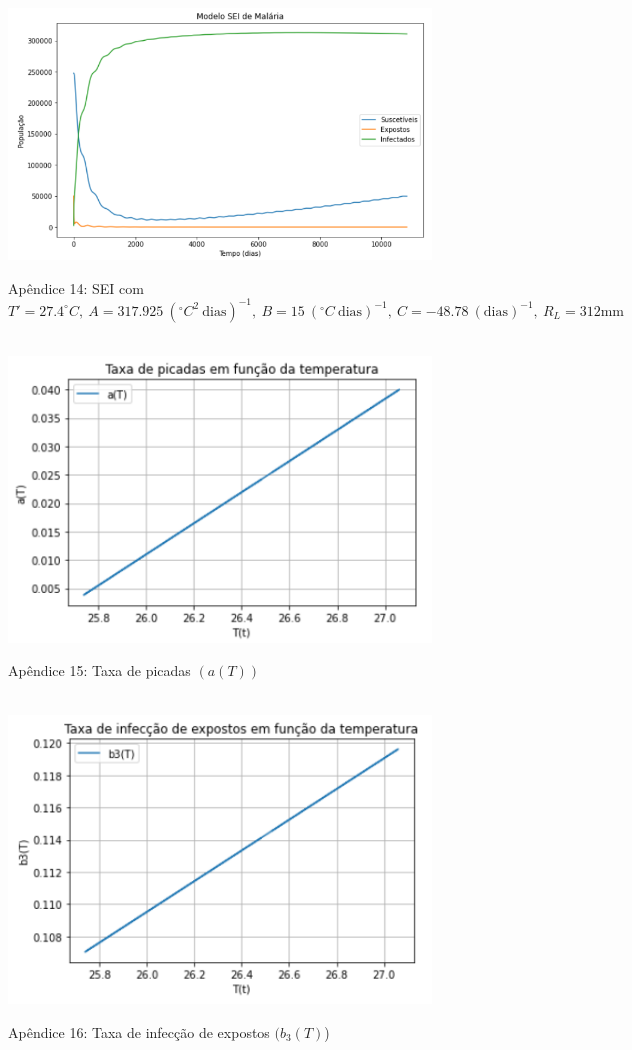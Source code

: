 \documentclass[12pt]{article}
\begin{document}
\begin{figure}[!ht]
        \centering
        \hbox{\hspace{3.5em} \includegraphics[scale=0.6] {SEI_Correcao_max_T_linha.png}}
        \caption*{Apêndice 14: SEI com $T'=27.4^\circ C, \ A=317.925 \ (^\circ C^2 \ \text{dias})^{-1}, \ B=15 \ (^\circ C \ \text{dias})^{-1}, \ C=-48.78 \ (\text{dias})^{-1}, \ R_L=312 \text{mm}$}
\end{figure}
\newpage
\begin{figure}[!ht]
        \centering
        \hbox{\hspace{4.0em} \includegraphics[scale=1.0] {Plot_a(T).png}}
        \caption*{Apêndice 15: Taxa de picadas $(a(T))$} 
\end{figure} 
\begin{figure}[!ht]
        \centering
        \hbox{\hspace{4.0em} \includegraphics[scale=1.0] {Plot_b3(T).png}}
        \caption*{Apêndice 16: Taxa de infecção de expostos $(b_3(T)$)} 
\end{figure} 
\end{document}
